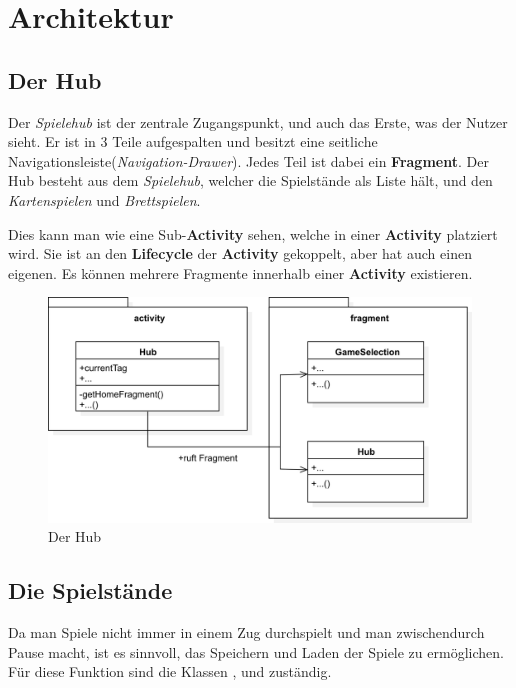\chapter{Architektur}

\section{Der Hub}
\sectionauthor{\leonard}

Der \emph{Spielehub} ist der zentrale Zugangspunkt, und auch das Erste, was der
Nutzer sieht. Er ist in 3 Teile aufgespalten und besitzt eine seitliche
Navigationsleiste(\emph{Navigation-Drawer}). Jedes Teil ist dabei ein
\textbf{Fragment}. Der Hub besteht aus dem \emph{Spielehub}, welcher die
Spielstände als Liste hält, und den \emph{Kartenspielen} und \emph{Brettspielen}.

\begin{infobox}[frametitle=Fragment]
Dies kann man wie eine Sub-\textbf{Activity} sehen, welche in einer
\textbf{Activity} platziert wird. Sie ist an den \textbf{Lifecycle} der
\textbf{Activity} gekoppelt, aber hat auch einen eigenen. Es können
mehrere Fragmente innerhalb einer \textbf{Activity} existieren.
\end{infobox}

\begin{figure}[h]
	\centering
	\includegraphics[width=1.0\textwidth]{resources/savegamestorage/Hub}
	\caption{Der Hub}
\end{figure}

\section{Die Spielstände}
\sectionauthor{\leonard}

Da man Spiele nicht immer in einem Zug durchspielt und man zwischendurch Pause
macht, ist es sinnvoll, das Speichern und Laden der Spiele zu ermöglichen. Für
diese Funktion sind die Klassen ,  und
 zuständig.


